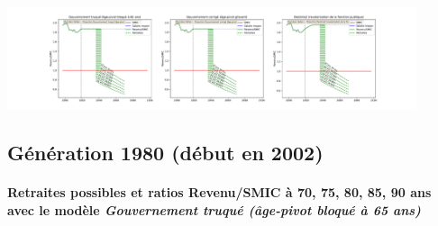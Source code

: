  \begin{center}\includegraphics[width=0.9\textwidth]{fig/SMPT_1975_22_dest_retraite.pdf}\end{center} \label{fig/SMPT_1975_22_dest_retraite.pdf} 

\newpage 
 
\subsection{Génération 1980 (début en 2002)} 

\paragraph{Retraites possibles et ratios Revenu/SMIC à 70, 75, 80, 85, 90 ans avec le modèle \emph{Gouvernement truqué (âge-pivot bloqué à 65 ans)}}  
 
